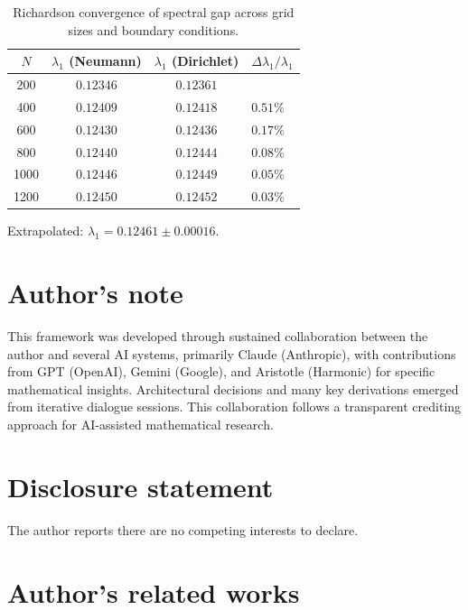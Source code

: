 \documentclass[11pt,a4paper]{article}
\begin{document}
\begin{table}[ht]
\centering
\begin{tabular}{cccl}
\toprule
$N$ & $\lambda_1$ (Neumann) & $\lambda_1$ (Dirichlet) & $\Delta\lambda_1/\lambda_1$ \\
\midrule
200  & $0.12346$ & $0.12361$ &  \\
400  & $0.12409$ & $0.12418$ & $0.51\%$ \\
600  & $0.12430$ & $0.12436$ & $0.17\%$ \\
800  & $0.12440$ & $0.12444$ & $0.08\%$ \\
1000 & $0.12446$ & $0.12449$ & $0.05\%$ \\
1200 & $0.12450$ & $0.12452$ & $0.03\%$ \\
\bottomrule
\end{tabular}
\caption{Richardson convergence of spectral gap across grid sizes and boundary conditions.}
\label{tab:convergence}
\end{table}

Extrapolated: $\lambda_1 = 0.12461 \pm 0.00016$.

\section*{Author's note}

This framework was developed through sustained collaboration between the author and several AI systems, primarily Claude (Anthropic), with contributions from GPT (OpenAI), Gemini (Google), and Aristotle (Harmonic) for specific mathematical insights. Architectural decisions and many key derivations emerged from iterative dialogue sessions. This collaboration follows a transparent crediting approach for AI-assisted mathematical research.

\section*{Disclosure statement}

The author reports there are no competing interests to declare.

\section*{Author's related works}
\end{document}
